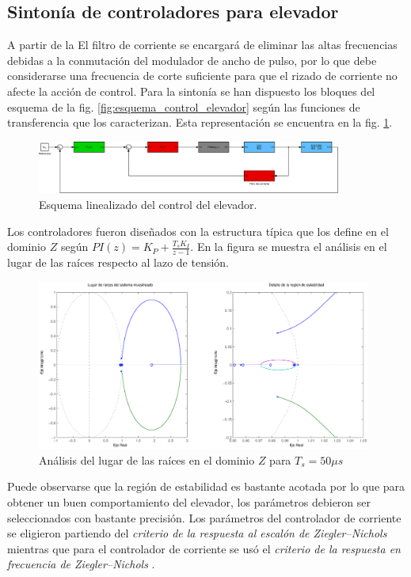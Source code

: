 \subsection{Sintonía de controladores para elevador}
\label{sub:sintonia_elevador}
A partir de la El filtro de corriente se encargará de eliminar las altas frecuencias debidas a la conmutación del modulador de ancho de pulso, por lo que
debe considerarse una frecuencia de corte suficiente para que el rizado de corriente no afecte la acción de control. Para la sintonía se han dispuesto los
bloques del esquema de la fig. \ref{fig:esquema_control_elevador} según las funciones de transferencia que los caracterizan. Esta representación se encuentra
en la fig. \ref{fig:esquema_control_elevador_lineal}.

\begin{figure}[H]
  \centering
  \includegraphics[width=10cm]{gfx/esquema_control_elevador_lineal.eps}
  \caption{Esquema linealizado del control del elevador.}
  \label{fig:esquema_control_elevador_lineal}
\end{figure}

Los controladores fueron diseñados con la estructura típica que los define en el dominio $Z$ según $PI(z)=K_{P}+\frac{T_{s}K_{I}}{z-1}$.
En la figura se muestra el análisis en el lugar de las raíces respecto al lazo de tensión.

\begin{figure}[H]
  \centering
  \includegraphics[width=11cm]{gfx/rlocus_elevador.eps}
  \caption{Análisis del lugar de las raíces en el dominio $Z$ para $T_{s}=50\mu s$}
  \label{fig:rlocus_elevador}
\end{figure}

Puede observarse que la región de estabilidad es bastante acotada por lo que para obtener un buen comportamiento del elevador, los parámetros
debieron ser seleccionados con bastante precisión. Los parámetros del controlador de corriente se eligieron partiendo
del \emph{criterio de la respuesta al escalón de Ziegler–Nichols } mientras que para el controlador de corriente se usó el \emph{criterio de la
respuesta en frecuencia de Ziegler–Nichols }.

